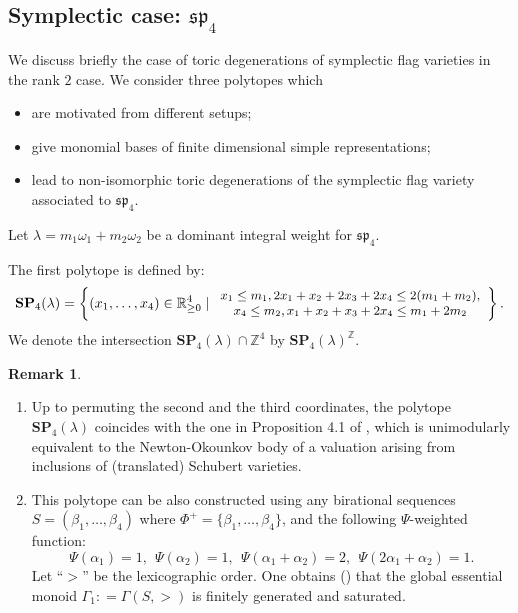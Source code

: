 \documentclass{emsprocart}
\theoremstyle{definition}
\newtheorem{remark}[theorem]{Remark}
\begin{document}
\subsection{Symplectic case: \texorpdfstring{$\mathfrak{sp}_4$}{}}
We discuss briefly the case of toric degenerations of symplectic flag varieties in the rank $2$ case.
We consider three polytopes which
\begin{itemize}
\item are motivated from different setups;
\item give monomial bases of finite dimensional simple representations; \item lead to non-isomorphic toric degenerations of the symplectic flag variety associated to $\mathfrak{sp}_4$.
\end{itemize}
\par
Let $\lambda = m_1 \omega_1 + m_2 \omega_2$ be a dominant integral weight for $\mathfrak{sp}_4$.
\par
The first polytope is defined by:
\[
\mathbf{SP}_{4}(\lambda) = \left\{ (x_1,\ldots,x_4) \in \mathbb{R}_{\geq 0}^4 \mid 
{\small
\begin{array}{c} x_1\leq m_1, 2x_1+x_2+2x_3+2x_4\leq 2(m_1+m_2), \\  x_4\leq m_2, x_1+x_2+x_3+2x_4\leq m_1+2m_2\end{array}
}
\right\}.
\]
We denote the intersection $\mathbf{SP}_4(\lambda) \cap \mathbb{Z}^4$ by $\mathbf{SP}_4(\lambda) ^{\mathbb{Z}}$.
\begin{remark}\label{remark:sp4.1}
\begin{enumerate}
\item Up to permuting the second and the third coordinates, the polytope $\mathbf{SP}_4(\lambda)$ coincides with the one in Proposition 4.1 of \cite{K2}, 
which is unimodularly equivalent to the Newton-Okounkov body of a valuation arising from inclusions of (translated) Schubert varieties.
\item This polytope can be also constructed using any birational sequences $S=(\beta_1,\ldots,\beta_4)$ where $\Phi^+=\{\beta_1,\ldots,\beta_4\}$,
and the following $\Psi$-weighted function:
$$\Psi(\alpha_1) =1,\ \ \Psi(\alpha_2) = 1,\ \ \Psi(\alpha_1 + \alpha_2) = 2,\ \ \Psi(2\alpha_1 + \alpha_2) =1.$$
Let ``$>$'' be the lexicographic order. One obtains (\cite{BFF}) that the global essential monoid $\Gamma_1: =\Gamma(S,>)$ is finitely generated and saturated. 
\end{enumerate}
\end{remark}
\end{document}
